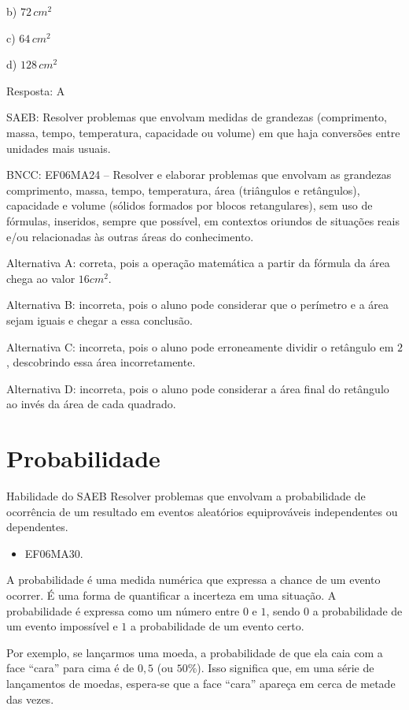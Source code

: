 b) $72\,cm^2$

c) $64\,cm^2$

d) $128\,cm^2$

Resposta: A

SAEB: Resolver problemas que envolvam medidas de grandezas (comprimento,
massa, tempo, temperatura, capacidade ou volume) em que haja conversões
entre unidades mais usuais.

BNCC: EF06MA24 -- Resolver e elaborar problemas que envolvam as
grandezas comprimento, massa, tempo, temperatura, área (triângulos e
retângulos), capacidade e volume (sólidos formados por blocos
retangulares), sem uso de fórmulas, inseridos, sempre que possível, em
contextos oriundos de situações reais e/ou relacionadas às outras áreas
do conhecimento.

Alternativa A: correta, pois a operação matemática a partir da fórmula
da área chega ao valor $16cm^2$.

Alternativa B: incorreta, pois o aluno pode considerar que o perímetro e
a área sejam iguais e chegar a essa conclusão.

Alternativa C: incorreta, pois o aluno pode erroneamente dividir o
retângulo em $2$, descobrindo essa área incorretamente.

Alternativa D: incorreta, pois o aluno pode considerar a área final do
retângulo ao invés da área de cada quadrado.

\chapter{ Probabilidade}

Habilidade do SAEB Resolver problemas que envolvam a probabilidade de
ocorrência de um resultado em eventos aleatórios equiprováveis
independentes ou dependentes.


\begin{itemize}
\item EF06MA30.
\end{itemize}

A probabilidade é uma medida numérica que expressa a chance de um evento
ocorrer. É uma forma de quantificar a incerteza em uma situação. A
probabilidade é expressa como um número entre $0$ e $1$, sendo $0$ a
probabilidade de um evento impossível e $1$ a probabilidade de um evento
certo.

Por exemplo, se lançarmos uma moeda, a probabilidade de que ela caia com
a face ``cara'' para cima é de $0,5$ (ou $50\%$). Isso significa que, em uma
série de lançamentos de moedas, espera-se que a face ``cara'' apareça em
cerca de metade das vezes.

